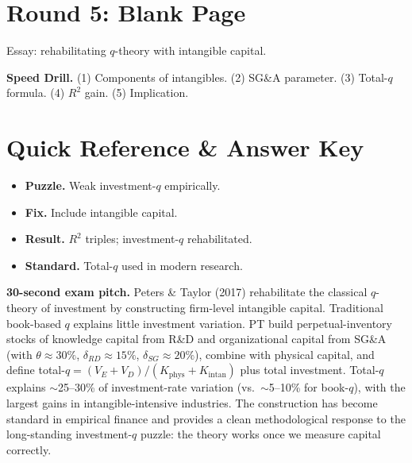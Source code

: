 \documentclass[11pt]{article}
\begin{document}
\section*{Round 5: Blank Page}
Essay: rehabilitating $q$-theory with intangible capital.

\vspace{6pt}
\begin{drillbox}
\textbf{Speed Drill.} (1) Components of intangibles. (2) SG\&A parameter. (3) Total-$q$ formula. (4) $R^2$ gain. (5) Implication.
\end{drillbox}

\section*{Quick Reference \& Answer Key}
\begin{answerbox}
\begin{itemize}
\item \textbf{Puzzle.} Weak investment-$q$ empirically.
\item \textbf{Fix.} Include intangible capital.
\item \textbf{Result.} $R^2$ triples; investment-$q$ rehabilitated.
\item \textbf{Standard.} Total-$q$ used in modern research.
\end{itemize}
\end{answerbox}

\begin{keybox}
\textbf{30-second exam pitch.} Peters \& Taylor (2017) rehabilitate the classical $q$-theory of investment by constructing firm-level intangible capital. Traditional book-based $q$ explains little investment variation. PT build perpetual-inventory stocks of knowledge capital from R\&D and organizational capital from SG\&A (with $\theta\approx30\%$, $\delta_{RD}\approx15\%$, $\delta_{SG}\approx20\%$), combine with physical capital, and define total-$q=(V_E+V_D)/(K_{\text{phys}}+K_{\text{intan}})$ plus total investment. Total-$q$ explains $\sim$25--30\% of investment-rate variation (vs.\ $\sim$5--10\% for book-$q$), with the largest gains in intangible-intensive industries. The construction has become standard in empirical finance and provides a clean methodological response to the long-standing investment-$q$ puzzle: the theory works once we measure capital correctly.
\end{keybox}
\end{document}

